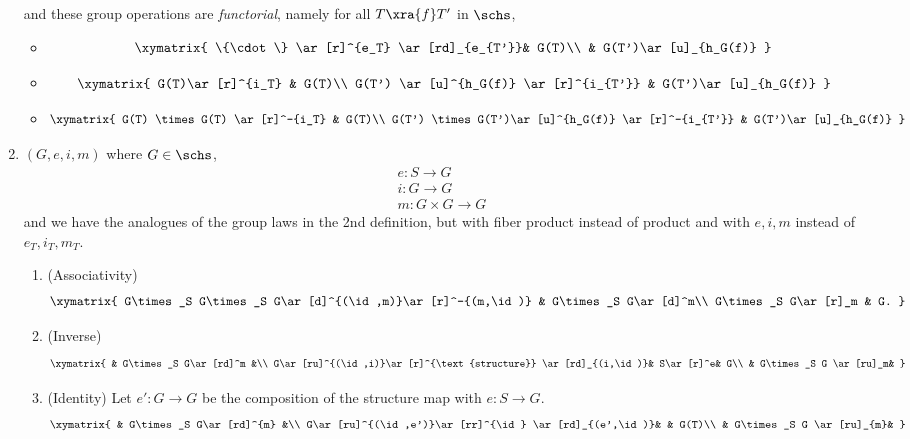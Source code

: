 \begin{df}
\begin{enumerate}
and these group operations are {\it functorial}, namely for all $T\xra{f} T'$ in $\schs$, 
\begin{itemize}
\item
\[
\xymatrix{
\{\cdot \} \ar[r]^{e_T} \ar[rd]_{e_{T'}}& G(T)\\
& G(T')\ar[u]_{h_G(f)}
}
\]
\item
\[
\xymatrix{
G(T)\ar[r]^{i_T} & G(T)\\
G(T') \ar[u]^{h_G(f)} \ar[r]^{i_{T'}} & G(T')\ar[u]_{h_G(f)}
}
\]
\item %
\[
\xymatrix{
G(T) \times G(T) \ar[r]^-{i_T} & G(T)\\
G(T') \times G(T')\ar[u]^{h_G(f)} \ar[r]^-{i_{T'}} & G(T')\ar[u]_{h_G(f)}
}
\]
\end{itemize}
\item $(G,e,i,m)$ where $G\in \schs$, 
\begin{gather*}
e:S\to G\\
i:G\to G\\
m:G\times G\to G
\end{gather*}
and we have the analogues of the group laws in the 2nd definition, but with fiber product instead of product and with $e,i,m$ instead of $e_T,i_T,m_T$.
\begin{enumerate}
\item (Associativity)
\[
\xymatrix{
G\times_S G\times_S G\ar[d]^{(\id,m)}\ar[r]^-{(m,\id)} & G\times_S G\ar[d]^m\\
G\times_S G\ar[r]_m & G.
}
\]
\item (Inverse) %
\[
\xymatrix{
& G\times_S G\ar[rd]^m &\\
G\ar[ru]^{(\id,i)}\ar[r]^{\text{structure}} \ar[rd]_{(i,\id)}& S\ar[r]^e& G\\
& G\times_S G \ar[ru]_m&
}
\]
\item (Identity) Let $e':G\to G$ be the composition of the structure map with $e:S\to G$.
\[
\xymatrix{
& G\times_S G\ar[rd]^{m} &\\
G\ar[ru]^{(\id,e')}\ar[rr]^{\id} \ar[rd]_{(e',\id)}& & G(T)\\
& G\times_S G \ar[ru]_{m}&
}
\]
\end{enumerate}
\end{enumerate}
\end{df}

